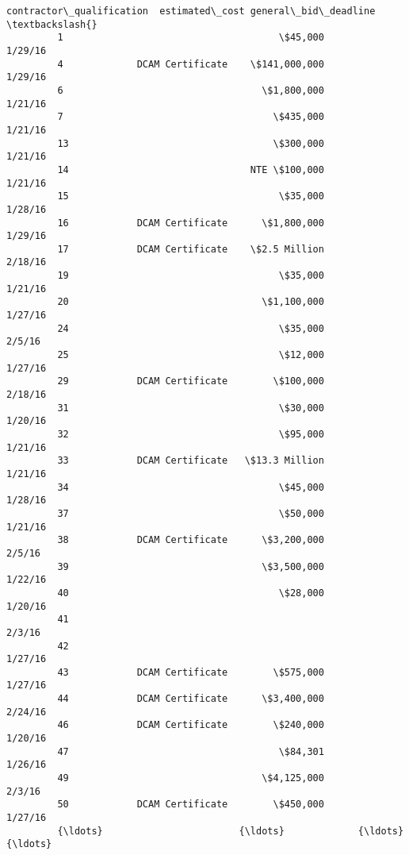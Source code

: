 \documentclass[11pt]{article}
\begin{document}
\begin{Verbatim}[commandchars=\\\{\}]
               contractor\_qualification  estimated\_cost general\_bid\_deadline  \textbackslash{}
         1                                      \$45,000              1/29/16   
         4             DCAM Certificate    \$141,000,000              1/29/16   
         6                                   \$1,800,000              1/21/16   
         7                                     \$435,000              1/21/16   
         13                                    \$300,000              1/21/16   
         14                                NTE \$100,000              1/21/16   
         15                                     \$35,000              1/28/16   
         16            DCAM Certificate      \$1,800,000              1/29/16   
         17            DCAM Certificate    \$2.5 Million              2/18/16   
         19                                     \$35,000              1/21/16   
         20                                  \$1,100,000              1/27/16   
         24                                     \$35,000               2/5/16   
         25                                     \$12,000              1/27/16   
         29            DCAM Certificate        \$100,000              2/18/16   
         31                                     \$30,000              1/20/16   
         32                                     \$95,000              1/21/16   
         33            DCAM Certificate   \$13.3 Million              1/21/16   
         34                                     \$45,000              1/28/16   
         37                                     \$50,000              1/21/16   
         38            DCAM Certificate      \$3,200,000               2/5/16   
         39                                  \$3,500,000              1/22/16   
         40                                     \$28,000              1/20/16   
         41                                                           2/3/16   
         42                                                          1/27/16   
         43            DCAM Certificate        \$575,000              1/27/16   
         44            DCAM Certificate      \$3,400,000              2/24/16   
         46            DCAM Certificate        \$240,000              1/20/16   
         47                                     \$84,301              1/26/16   
         49                                  \$4,125,000               2/3/16   
         50            DCAM Certificate        \$450,000              1/27/16   
         {\ldots}                        {\ldots}             {\ldots}                  {\ldots}   

\end{Verbatim}
\end{document}
